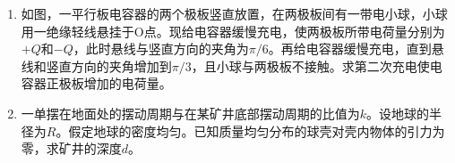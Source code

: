 \documentclass[\gkver]{gaokaozhenti}
\begin{document}
\begin{enumerate}
{（2）（i）为保证小车所受拉力近似不变，应满足小吊盘和盘中物块的质量之和远小于小车的质量。

（ii）由 $\Delta x=aT^{2}$ 可知，$a=\frac{s_{3}-s_{1}}{2(5\Delta t)^{2}}=\frac{s_{3}-s_{1}}{50(\Delta t)^{2}}$。由图可读出 $s_{1}=36.8-12.5=24.3\Umm$，$s_{3}=120.0-72.8=47.2\Umm$，$a=\frac{s_{3}-s_{1}}{2(5\Delta t)^{2}}=\frac{(47.2-24.3)\times10^{-3}}{2\times(5\times0.02)^{2}}\Umsq=1.15\Umsq$。

（iii）设小车的质量为 $m'$，则有 $F=(m+m')a$，变形得 $\frac{1}{a}=\frac{1}{F}m+\frac{m'}{F}$，所以 $\frac{1}{a}-m$ 图象的斜率为 $\frac{1}{F}=k$，所以作用力 $F=\frac{1}{k}$，图象的截距为 $\frac{m'}{F}=b$，所以 $m'=\frac{b}{k}$。
}

\item
如图，一平行板电容器的两个极板竖直放置，在两极板间有一带电小球，小球用一绝缘轻线悬挂于O点。现给电容器缓慢充电，使两极板所带电荷量分别为$+Q$和$-Q$，此时悬线与竖直方向的夹角为$\pi/6$。再给电容器缓慢充电，直到悬线和竖直方向的夹角增加到$\pi/3$，且小球与两极板不接触。求第二次充电使电容器正极板增加的电荷量。

\item
一单摆在地面处的摆动周期与在某矿井底部摆动周期的比值为$k$。设地球的半径为$R$。假定地球的密度均匀。已知质量均匀分布的球壳对壳内物体的引力为零，求矿井的深度$d$。
\end{enumerate}
\end{document}
